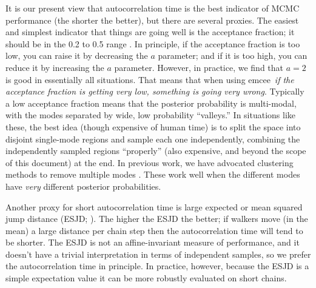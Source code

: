 \documentclass[12pt,preprint]{aastex}
\newcommand{\project}[1]{{\sffamily #1}}
\newcommand{\thisplain}{emcee}
\newcommand{\this}{\project{\thisplain}}
\begin{document}
It is our present view that autocorrelation time is the best indicator
of MCMC performance (the shorter the better), but there are several
proxies.  The easiest and simplest indicator that things are going
well is the acceptance fraction; it should be in the 0.2 to 0.5 range
\citep[there are theorems about this for specific problems;
for example][]{Gelman:1996}.  In principle,
if the acceptance fraction is too low, you can raise it by decreasing
the $a$ parameter; and if it is too high, you can reduce it by
increasing the $a$ parameter.  However, in practice, we find that
$a=2$ is good in essentially all situations.  That means that when
using \this\ \emph{if the acceptance fraction is getting very low,
  something is going very wrong}.  Typically a low acceptance fraction
means that the posterior probability is multi-modal, with the modes
separated by wide, low probability ``valleys.''  In situations like
these, the best idea (though expensive of human time) is to split the
space into disjoint single-mode regions and sample each one
independently, combining the independently sampled regions
``properly'' (also expensive, and beyond the scope of this document)
at the end.  In previous work, we have advocated clustering methods to
remove multiple modes \citep{Hou:2011}.  These work well when the
different modes have \emph{very} different posterior probabilities.

Another proxy for short autocorrelation time is large expected or mean
squared jump distance (ESJD; \citealt{Pasarica:2010}).  The higher the
ESJD the better; if walkers move (in the mean) a large distance per
chain step then the
autocorrelation time will tend to be shorter.  The ESJD is not an
affine-invariant measure of performance, and it doesn't have a
trivial interpretation in terms of independent samples, so we prefer
the autocorrelation time in principle.  In practice, however, because
the ESJD is a simple expectation value it can be more robustly
evaluated on short chains.
\end{document}
